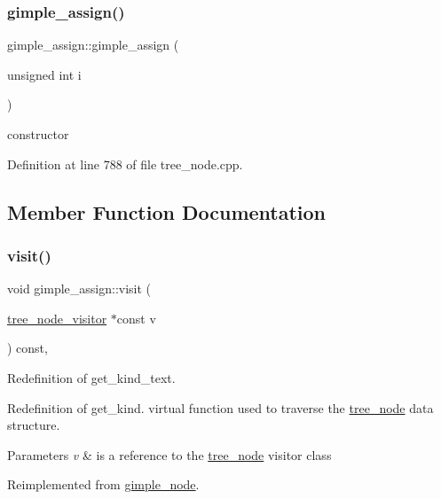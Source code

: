 \subsubsection{\texorpdfstring{gimple\+\_\+assign()}{gimple\_assign()}}
{\footnotesize\ttfamily gimple\+\_\+assign\+::gimple\+\_\+assign (\begin{DoxyParamCaption}\item[{unsigned int}]{i }\end{DoxyParamCaption})\hspace{0.3cm}{\ttfamily [explicit]}}



constructor 



Definition at line 788 of file tree\+\_\+node.\+cpp.



\subsection{Member Function Documentation}
\mbox{\label{structgimple__assign_afc25fa9b669662e4f64f09c62284dec2}} 
\subsubsection{\texorpdfstring{visit()}{visit()}}
{\footnotesize\ttfamily void gimple\+\_\+assign\+::visit (\begin{DoxyParamCaption}\item[{\hyperlink{classtree__node__visitor}{tree\+\_\+node\+\_\+visitor} $\ast$const}]{v }\end{DoxyParamCaption}) const\hspace{0.3cm}{\ttfamily [override]}, {\ttfamily [virtual]}}



Redefinition of get\+\_\+kind\+\_\+text. 

Redefinition of get\+\_\+kind. virtual function used to traverse the \hyperlink{classtree__node}{tree\+\_\+node} data structure. 
\begin{DoxyParams}{Parameters}
{\em v} & is a reference to the \hyperlink{classtree__node}{tree\+\_\+node} visitor class \\
\hline
\end{DoxyParams}


Reimplemented from \hyperlink{structgimple__node_a337b029a3aca9c1b96311b6e6668f7f3}{gimple\+\_\+node}.



